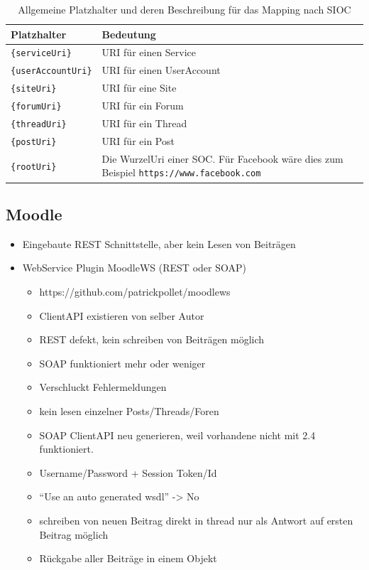 \begin{table}[ht]
    \centering
    \caption{Allgemeine Platzhalter und deren Beschreibung für das Mapping nach SIOC}
    \begin{tabular}{l|p{11cm}}
        \textbf{Platzhalter} & \textbf{Bedeutung} \\ 
        \hline
        \texttt{\{serviceUri\}} & URI für einen Service \\
        \texttt{\{userAccountUri\}} & URI für einen UserAccount \\
        \texttt{\{siteUri\}} & URI für eine Site \\
        \texttt{\{forumUri\}} & URI für ein Forum \\
        \texttt{\{threadUri\}} & URI für ein Thread \\
        \texttt{\{postUri\}} & URI für ein Post \\
        \texttt{\{rootUri\}} & Die WurzelUri einer SOC. Für Facebook wäre dies zum Beispiel \texttt{https://www.facebook.com}
    \end{tabular}
    \label{tbl:platzhalter_fuer_sioc_mapping}
\end{table}

\subsection{Moodle} %
\label{sub:moodle_connector}

\begin{itemize}
    \item Eingebaute REST Schnittstelle, aber kein Lesen von Beiträgen
    \item WebService Plugin MoodleWS (REST oder SOAP)
    \begin{itemize}
        \item https://github.com/patrickpollet/moodlews
        \item ClientAPI existieren von selber Autor
        \item REST defekt, kein schreiben von Beiträgen möglich
        \item SOAP funktioniert mehr oder weniger
        \item Verschluckt Fehlermeldungen
        \item kein lesen einzelner Posts/Threads/Foren
        \item SOAP ClientAPI neu generieren, weil vorhandene nicht mit 2.4 funktioniert.
        \item Username/Password + Session Token/Id
        \item “Use an auto generated wsdl” -> No
        \item schreiben von neuen Beitrag direkt in thread nur als Antwort auf ersten Beitrag möglich
        \item Rückgabe aller Beiträge in einem Objekt
    \end{itemize}
\end{itemize}

